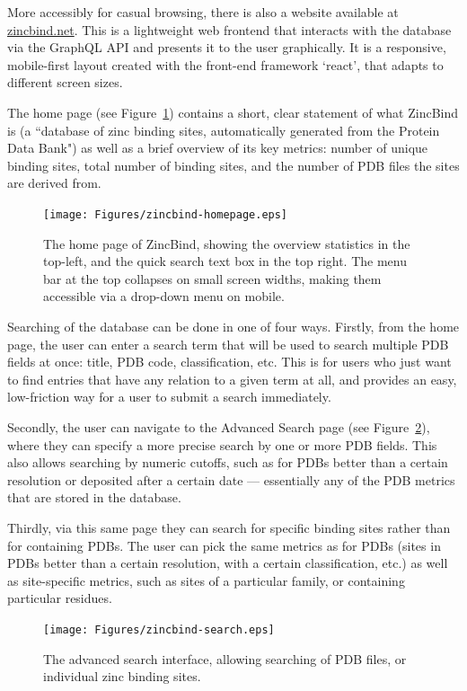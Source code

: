 More accessibly for casual browsing, there is also a website available at \url{zincbind.net}. This is a lightweight web frontend that interacts with the database via the GraphQL API and presents it to the user graphically. It is a responsive, mobile-first layout created with the front-end framework `react', that adapts to different screen sizes.

The home page (see Figure~\ref{fig:zincbind-homepage}) contains a short, clear statement of what ZincBind is (a ``database of zinc binding sites, automatically generated from the Protein Data Bank") as well as a brief overview of its key metrics: number of unique binding sites, total number of binding sites, and the number of PDB files the sites are derived from.

\begin{figure}
\centering
\texttt{[image: Figures/zincbind-homepage.eps]}
\caption[The home page of ZincBind.]{\label{fig:zincbind-homepage} The home page of ZincBind, showing the
overview statistics in the top-left, and the quick search text box in the top right.
The menu bar at the top collapses on small screen widths, making them accessible via a
drop-down menu on mobile.}
\end{figure}

Searching of the database can be done in one of four ways. Firstly, from the home page, the user can enter a search term that will be used to search multiple PDB fields at once: title, PDB code, classification, etc. This is for users who just want to find entries that have any relation to a given term at all, and provides an easy, low-friction way for a user to submit a search immediately.

Secondly, the user can navigate to the Advanced Search page (see Figure~\ref{fig:zincbind-search}), where they can specify a more precise search by one or more PDB fields. This also allows searching by numeric cutoffs, such as for PDBs better than a certain resolution or deposited after a certain date --- essentially any of the PDB metrics that are stored in the database.

Thirdly, via this same page they can search for specific binding sites rather than for containing PDBs. The user can pick the same metrics as for PDBs (sites in PDBs better than a certain resolution, with a certain classification, etc.) as well as site-specific metrics, such as sites of a particular family, or containing particular residues.

\begin{figure}
\centering
\texttt{[image: Figures/zincbind-search.eps]}
\caption[The advanced search interface.]{\label{fig:zincbind-search} The advanced search interface, allowing searching of
PDB files, or individual zinc binding sites.}
\end{figure}

